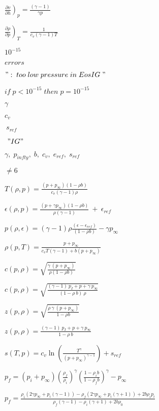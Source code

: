 \documentclass{article}
\begin{document}
$ \left. \frac{\partial v}{\partial h} \right)_p = \frac{(\gamma-1)}{\gamma p} $
\pagebreak

$ \left. \frac{\partial \rho}{\partial p} \right)_T = \frac{1}{c_v (\gamma - 1) T} $
\pagebreak

$ 10^{-15} $
\pagebreak

$ errors $
\pagebreak

$ " :\;too\;low\;pressure \;in\; EosIG\;"$
\pagebreak

$ if \; p < 10^{-15} \; then \; p= 10^{-15} $
\pagebreak

$ \gamma $
\pagebreak

$ c_v $
\pagebreak

$ \ s_{ref} $
\pagebreak

$ \ "IG" $
\pagebreak

$ \gamma, \; p_{infty}, \; b, \; c_v, \; e_{ref}, \; s_{ref}$
\pagebreak

$ \neq 6$
\pagebreak

$ T(\rho, p) = \frac{(p+p_{\infty})(1-\rho b)}{c_v (\gamma-1)\rho} $
\pagebreak

$ \epsilon (\rho, p) = \frac{(p + \gamma p_{\infty})(1-\rho b)}{\rho (\gamma-1)} \ + \ \epsilon_{ref} $
\pagebreak

$ p(\rho, \epsilon) = (\gamma-1)\rho \frac{(\epsilon - \epsilon_{ref})}{(1-\rho b)} - \gamma p_{\infty} $
\pagebreak

$ \rho(p, T) = \frac{p + p_{\infty} }{c_v T(\gamma-1) + b (p + p_{\infty})} $
\pagebreak

$ c(p, \rho) = \sqrt{ \frac{\gamma \ (p+p_{\infty})}{\rho (1-\rho b)}} $
\pagebreak

$ c(p, \rho) = \sqrt{ \frac{(\gamma-1) \ p_I + p + \gamma \ p_{\infty}}{(1 - \rho \ b) \ \rho}} $
\pagebreak

$ z(p, \rho) = \sqrt{ \frac{\rho \ \gamma \ (p+p_{\infty})}{1-\rho b} } $
\pagebreak

$ z(p, \rho) = \frac{(\gamma-1) \ p_I + p + \gamma \ p_{\infty}}{1 - \rho \ b} $
\pagebreak

$ s(T, p) = c_v \ln \left( \frac{T^\gamma} { (p+p_{\infty})^{\gamma-1} } \right)+s_{ref} $
\pagebreak

$ p_f = (p_i+p_{\infty}) \left( \frac{\rho_f}{\rho_i} \right)^\gamma \left(\frac{1-\rho_i b}{1-\rho_f b}\right)^\gamma -p_{\infty} $
\pagebreak

$ p_f = \frac{\rho_i\left(2\gamma p_{\infty}+p_i (\gamma-1)\right)-\rho_f \left(2\gamma p_{\infty}+p_i (\gamma +1)\right)+2b\rho_i p_i}{\rho_f (\gamma-1)-\rho_i (\gamma+1)+2b\rho_0} $
\pagebreak
\end{document}
